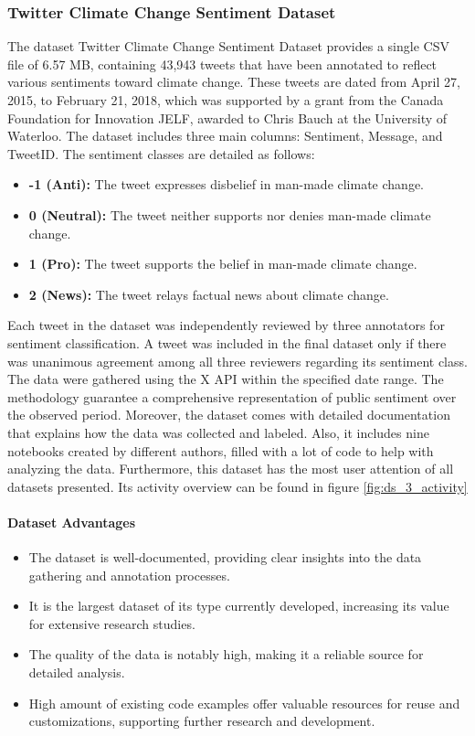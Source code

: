 \subsubsection{Twitter Climate Change Sentiment Dataset}
The dataset Twitter Climate Change Sentiment Dataset \cite{TwitterClimateChangeSentimentDataset} provides a single CSV file of 6.57 MB, containing 43,943 tweets that have been annotated to reflect various sentiments toward climate change. These tweets are dated from April 27, 2015, to February 21, 2018, which was supported by a grant from the Canada Foundation for Innovation JELF, awarded to Chris Bauch at the University of Waterloo. The dataset includes three main columns: Sentiment, Message, and TweetID. The sentiment classes are detailed as follows:
\begin{itemize}
    \item \textbf{-1 (Anti):} The tweet expresses disbelief in man-made climate change.
    \item \textbf{ 0 (Neutral):} The tweet neither supports nor denies man-made climate change.
    \item \textbf{ 1 (Pro):} The tweet supports the belief in man-made climate change.
    \item \textbf{ 2 (News):} The tweet relays factual news about climate change.
\end{itemize}
Each tweet in the dataset was independently reviewed by three annotators for sentiment classification. A tweet was included in the final dataset only if there was unanimous agreement among all three reviewers regarding its sentiment class. The data were gathered using the X API within the specified date range. The methodology guarantee a comprehensive representation of public sentiment over the observed period.
Moreover, the dataset comes with detailed documentation that explains how the data was collected and labeled. Also, it includes nine notebooks created by different authors, filled with a lot of code to help with analyzing the data. Furthermore, this dataset has the most user attention of all datasets presented. Its activity overview can be found in figure \ref{fig:ds_3_activity}

\paragraph{Dataset Advantages}
\begin{itemize}
    \item The dataset is well-documented, providing clear insights into the data gathering and annotation processes.
    \item It is the largest dataset of its type currently developed, increasing its value for extensive research studies.
    \item The quality of the data is notably high, making it a reliable source for detailed analysis.
    \item High amount of existing code examples offer valuable resources for reuse and customizations, supporting further research and development. 
\end{itemize}
